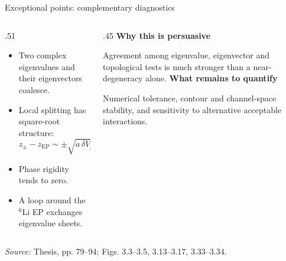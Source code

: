 \documentclass[aspectratio=169,11pt]{beamer}
\newcommand{\nuc}[2]{\ensuremath{{}^{#1}\mathrm{#2}}}
\newcommand{\EP}{\mathrm{EP}}
\newcommand{\src}[1]{\par\vfill{\color{muted}\fontsize{7.5}{9}\selectfont\textit{Source:} #1\par}}
\newcommand{\spacer}{\vspace{2mm}}
\begin{document}
\begin{frame}{Exceptional points: complementary diagnostics}
\begin{columns}[T]
\begin{column}{.51\textwidth}
\begin{itemize}\setlength\itemsep{2mm}
\item Two complex eigenvalues and their eigenvectors coalesce.
\item Local splitting has square-root structure:
\[z_\pm-z_{\EP}\sim\pm\sqrt{a\,\delta V_p+b\,\delta V_n}.\]
\item Phase rigidity tends to zero.
\item A loop around the \nuc{6}{Li} EP exchanges eigenvalue sheets.
\end{itemize}
\end{column}
\begin{column}{.45\textwidth}
\textbf{Why this is persuasive}
\spacer
\par Agreement among eigenvalue, eigenvector and topological tests is much stronger than a near-degeneracy alone.
\medskip
\textbf{What remains to quantify}
\spacer
\par Numerical tolerance, contour and channel-space stability, and sensitivity to alternative acceptable interactions.
\end{column}
\end{columns}
\src{Thesis, pp. 79--94; Figs. 3.3--3.5, 3.13--3.17, 3.33--3.34.}
\end{frame}
\end{document}
